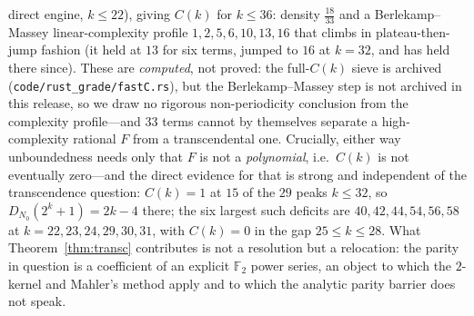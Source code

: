 \documentclass[11pt]{article}
\theoremstyle{remark}\newtheorem{remark}[theorem]{Remark}
\begin{document}
direct engine, $k\le22$), giving $C(k)$ for $k\le36$: density $\tfrac{18}{33}$ and a
Berlekamp--Massey linear-complexity profile $1,2,5,6,10,13,16$ that climbs in plateau-then-jump
fashion (it held at $13$ for six terms, jumped to $16$ at $k=32$, and has held there since). These are
\emph{computed}, not proved: the full-$C(k)$ sieve is archived (\texttt{code/rust\_grade/fastC.rs}),
but the Berlekamp--Massey step is not archived in this release, so we draw no rigorous
non-periodicity conclusion from the complexity profile---and $33$ terms cannot by themselves
separate a high-complexity rational $F$ from a transcendental one. Crucially, either way unboundedness
needs only that $F$ is not a \emph{polynomial}, i.e.\ $C(k)$ is not eventually zero---and the direct
evidence for that is strong and independent of the transcendence question: $C(k)=1$ at $15$ of the
$29$ peaks $k\le32$, so $D_{N_0}(2^k+1)=2k-4$ there; the six largest such deficits are
$40,42,44,54,56,58$ at $k=22,23,24,29,30,31$, with $C(k)=0$ in the gap $25\le k\le28$. What Theorem~\ref{thm:transc} contributes is not a resolution but a relocation:
the parity in question is a coefficient of an explicit $\mathbb F_2$ power series, an object to which
the $2$-kernel and Mahler's method apply and to which the analytic parity barrier does not speak.
\end{document}
